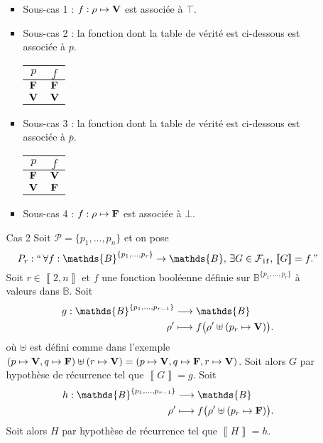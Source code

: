 \begin{enumerate}
\begin{itemize}
				\begin{itemize}
					\item Sous-cas 1 : $f: \rho \mapsto {\mathbf{V}}$\/ est associée à $\top$.
					\item Sous-cas 2 :  la fonction dont la table de vérité est ci-dessous est associée à $p$.
						\begin{center}
							\begin{tabular}{c|c}
								$p$&$f$\\ \hline
								${\mathbf{F}}$ & ${\mathbf{F}}$\/ \\
								${\mathbf{V}}$ & ${\mathbf{V}}$\/ \\
							\end{tabular}
						\end{center}
					\item Sous-cas 3 :  la fonction dont la table de vérité est ci-dessous est associée à $\bar{p}$.
						\begin{center}
							\begin{tabular}{c|c}
								$p$&$f$\\ \hline
								${\mathbf{F}}$ & ${\mathbf{V}}$\/ \\
								${\mathbf{V}}$ & ${\mathbf{F}}$\/ \\
							\end{tabular}
						\end{center}
					\item Sous-cas 4 : $f: \rho \mapsto {\mathbf{F}}$\/ est associée à $\bot$.
				\end{itemize}
			\item[Cas 2] Soit $\mathcal{P} = \{p_1, \ldots,p_n\}$\/ et on pose \[
					P_r : ``\,\forall f : \mathds{B}^{\{p_1, \ldots, p_r\}}\to \mathds{B},\,\exists G \in \mathcal{F}_{{\tt if}},\,\left\llbracket G \right\rrbracket = f."
				\]
				Soit $r \in  \left\llbracket 2,n \right\rrbracket$\/ et $f$\/ une fonction booléenne définie sur $\mathds{B}^{\{p_1, \ldots, p_r\}}$\/ à valeurs dans $\mathds{B}$. Soit \begin{align*}
					g: \mathds{B}^{\{p_1,\ldots,p_{r-1}\}} &\longrightarrow \mathds{B} \\
					\rho' &\longmapsto f\big(\rho' \uplus (p_r \mapsto {\bfm V}\/)\big).
				\end{align*}
				où $\uplus$\/ est défini comme dans l'exemple $(p\mapsto {\mathbf{V}}, q\mapsto {\mathbf{F}}) \uplus (r \mapsto {\mathbf{V}}) = (p\mapsto {\mathbf{V}}, q\mapsto {\mathbf{F}}, r \mapsto {\mathbf{V}})$.
				Soit alors $G$\/ par hypothèse de récurrence tel que $\left\llbracket G \right\rrbracket = g$.
				Soit \begin{align*}
					h: \mathds{B}^{\{p_1, \ldots,p_{r-1}\}} &\longrightarrow \mathds{B} \\
					\rho' &\longmapsto f\big(\rho'\uplus (p_r \mapsto {\bfm F})\big).
				\end{align*}
				Soit alors $H$\/ par hypothèse de récurrence tel que $\left\llbracket H \right\rrbracket = h$.


\end{itemize}
\end{enumerate}
